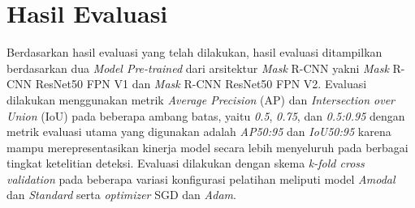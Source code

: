 



\section{Hasil Evaluasi} \label{IV.Hasil_Evaluasi}
Berdasarkan hasil evaluasi yang telah dilakukan, hasil evaluasi ditampilkan berdasarkan dua \textit{Model Pre-trained} dari arsitektur \textit{Mask} R-CNN yakni \textit{Mask} R-CNN ResNet50 FPN V1 dan \textit{Mask} R-CNN ResNet50 FPN V2. Evaluasi dilakukan menggunakan metrik \textit{Average Precision} (AP) dan \textit{Intersection over Union} (IoU) pada beberapa ambang batas, yaitu \textit{0.5}, \textit{0.75}, dan \textit{0.5:0.95} dengan metrik evaluasi utama yang digunakan adalah \textit{AP50:95} dan \textit{IoU50:95} karena mampu merepresentasikan kinerja model secara lebih menyeluruh pada berbagai tingkat ketelitian deteksi. Evaluasi dilakukan dengan skema \textit{k-fold cross validation} pada beberapa variasi konfigurasi pelatihan meliputi model \textit{Amodal} dan \textit{Standard} serta \textit{optimizer} SGD dan \textit{Adam}. \par

